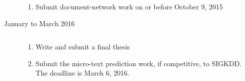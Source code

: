 \begin{description}
\begin{enumerate}
    \item Submit document-network work on or before October 9, 2015
\end{enumerate}
\item[January to March 2016] $\text{ }$\\
    \begin{enumerate}
        \item Write and submit a final thesis
        \item Submit the micro-text prediction work, if competitive, to SIGKDD. The deadline is March 6, 2016. 
    \end{enumerate}
\end{description}




